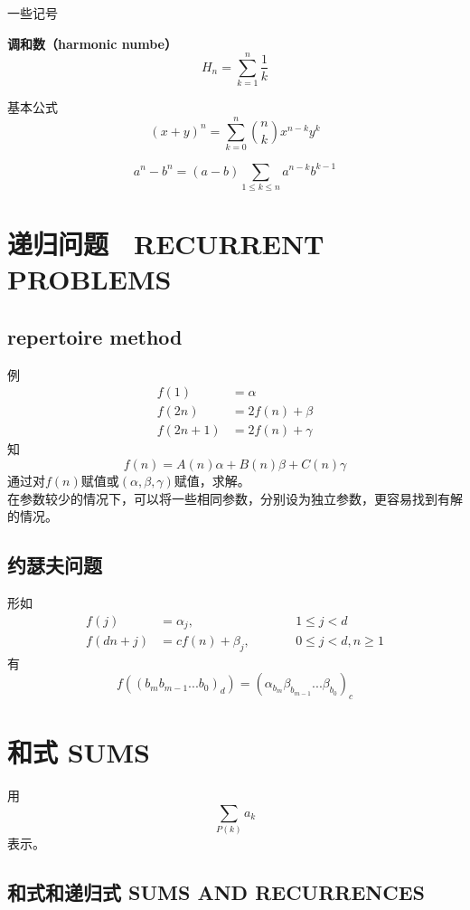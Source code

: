一些记号

\textbf{调和数（harmonic numbe）}
$$
H_n=\sum_{k=1}^{n} \frac{1}{k}
$$

基本公式
$$
(x+y)^n=\sum_{k=0}^{n}\binom{n}{k}x^{n-k}y^{k}
$$

$$
a^n-b^n=(a-b)\sum_{1 \le k\le n} a^{n-k}b^{k-1}
$$

\section{递归问题　RECURRENT PROBLEMS}

\subsection{repertoire method}
例
$$
\begin{aligned}
f(1)&=\alpha\\
f(2n)&=2f(n)+\beta\\
f(2n+1)&=2f(n)+\gamma
\end{aligned}
$$
知
$$
f(n)=A(n)\alpha+B(n)\beta+C(n)\gamma
$$
通过对$f(n)$赋值或$(\alpha,\beta,\gamma)$赋值，求解。\\

在参数较少的情况下，可以将一些相同参数，分别设为独立参数，更容易找到有解的情况。
\subsection{约瑟夫问题}
形如
$$
\begin{aligned}
f(j)&=\alpha_j,\qquad &&1\le j<d\\
f(dn+j)&=cf(n)+\beta_j,\qquad  &&0\le j<d,n\ge 1
\end{aligned}
$$
有
$$
f((b_mb_{m-1}...b_0)_d)=(\alpha_{b_m}\beta_{b_{m-1}}...\beta_{b_0})_c
$$




\section{和式 SUMS} 

用
$$
\sum_{P(k)} a_k
$$
表示。

\subsection{和式和递归式 SUMS AND RECURRENCES}

